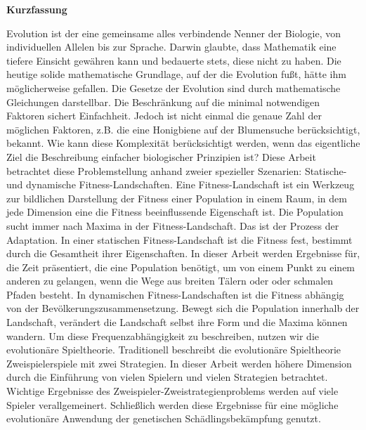 \documentclass[oneside,11pt,a4paper]{book}
\begin{document}
\newpage
\thispagestyle{plain}
\renewcommand{\thepage}{\roman{page}}
\begin{center}
\Large{\textbf{Kurzfassung}}
\end{center}
Evolution ist der eine gemeinsame alles verbindende Nenner der Biologie, von individuellen Allelen bis zur Sprache.
Darwin glaubte, dass Mathematik eine tiefere Einsicht gew\"ahren kann und bedauerte stets, diese nicht zu haben.
Die heutige solide mathematische Grundlage, auf der die Evolution fu{\ss}t, h\"atte ihm m\"oglicherweise gefallen.
Die Gesetze der Evolution sind durch mathematische Gleichungen darstellbar. Die Beschr\"ankung auf die minimal notwendigen Faktoren sichert Einfachheit.
Jedoch ist nicht einmal die genaue Zahl der m\"oglichen Faktoren, z.B. die eine Honigbiene auf der Blumensuche ber\"ucksichtigt, bekannt.
Wie kann diese Komplexit\"at ber\"ucksichtigt werden, wenn das eigentliche Ziel die Beschreibung einfacher biologischer Prinzipien ist?
Diese Arbeit betrachtet diese Problemstellung anhand zweier spezieller Szenarien: Statische- und dynamische Fitness-Landschaften.
Eine Fitness-Landschaft ist ein Werkzeug zur bildlichen Darstellung der Fitness einer Population in einem Raum, in dem jede Dimension eine die Fitness beeinflussende Eigenschaft ist.
Die Population sucht immer nach Maxima in der Fitness-Landschaft.
Das ist der Prozess der Adaptation.
In einer statischen Fitness-Landschaft ist die Fitness fest, bestimmt durch die Gesamtheit ihrer Eigenschaften.
In dieser Arbeit werden Ergebnisse f\"{u}r, die Zeit pr\"asentiert, die eine Population ben\"otigt, um von einem Punkt zu einem anderen zu gelangen, wenn die Wege aus breiten T\"alern oder oder schmalen Pfaden besteht.
In dynamischen Fitness-Landschaften ist die Fitness abh\"angig von der Bev\"olkerungszusammensetzung.
Bewegt sich die Population innerhalb der Landschaft, ver\"andert die Landschaft selbst ihre Form und die Maxima k\"onnen wandern.
Um diese Frequenzabh\"angigkeit zu beschreiben, nutzen wir die evolution\"{a}re Spieltheorie.
Traditionell beschreibt die evolution\"are Spieltheorie Zweispielerspiele mit zwei Strategien.
In dieser Arbeit werden h\"ohere Dimension durch die Einf\"uhrung von vielen Spielern und vielen Strategien betrachtet.
Wichtige Ergebnisse des Zweispieler-Zweistrategienproblems werden auf viele Spieler verallgemeinert.
Schlie{\ss}lich werden diese Ergebnisse f\"ur eine m\"ogliche evolution\"are Anwendung der genetischen Sch\"{a}dlingsbek\"{a}mpfung genutzt.
\end{document}
